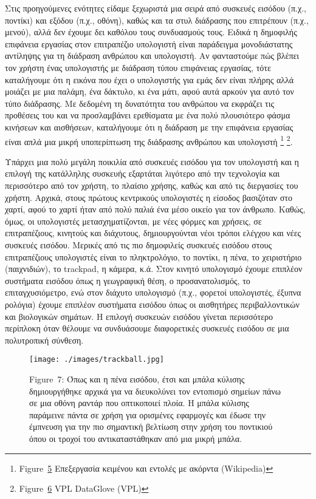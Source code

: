 \documentclass[
]{article}
\begin{document}
Στις προηγούμενες ενότητες είδαμε ξεχωριστά μια σειρά από συσκευές
εισόδου (π.χ., ποντίκι) και εξόδου (π.χ., οθόνη), καθώς και τα στυλ
διάδρασης που επιτρέπουν (π.χ., μενού), αλλά δεν έχουμε δει καθόλου τους
συνδυασμούς τους. Ειδικά η δημοφιλής επιφάνεια εργασίας στον επιτραπέζιο
υπολογιστή είναι παράδειγμα μονοδιάστατης αντίληψης για τη διάδραση
ανθρώπου και υπολογιστή. Αν φανταστούμε πώς βλέπει τον χρήστη ένας
υπολογιστής με διάδραση τύπου επιφάνειας εργασίας, τότε καταλήγουμε ότι
η εικόνα που έχει ο υπολογιστής για εμάς δεν είναι πλήρης αλλά μοιάζει
με μια παλάμη, ένα δάκτυλο, κι ένα μάτι, αφού αυτά αρκούν για αυτό τον
τύπο διάδρασης. Με δεδομένη τη δυνατότητα του ανθρώπου να εκφράζει τις
προθέσεις του και να προσλαμβάνει ερεθίσματα με ένα πολύ πλουσιότερο
φάσμα κινήσεων και αισθήσεων, καταλήγουμε ότι η διάδραση με την
επιφάνεια εργασίας είναι απλά μια μικρή υποπερίπτωση της διάδρασης
ανθρώπου και υπολογιστή \footnote{Figure~\protect\hyperlink{fig:chorded-input}{5}
  Επεξεργασία κειμένου και εντολές με ακόρντα (Wikipedia)} \footnote{Figure~\protect\hyperlink{fig:vpl-data-glove}{6}
  VPL DataGlove (VPL)}.

Υπάρχει μια πολύ μεγάλη ποικιλία από συσκευές εισόδου για τον υπολογιστή
και η επιλογή της κατάλληλης συσκευής εξαρτάται λιγότερο από την
τεχνολογία και περισσότερο από τον χρήστη, το πλαίσιο χρήσης, καθώς και
από τις διεργασίες του χρήστη. Αρχικά, στους πρώτους κεντρικούς
υπολογιστές η είσοδος βασιζόταν στο χαρτί, αφού το χαρτί ήταν από πολύ
παλιά ένα μέσο οικείο για τον άνθρωπο. Καθώς, όμως, οι υπολογιστές
μετασχηματίζονται, με νέες φόρμες και χρήσεις, σε επιτραπέζιους,
κινητούς και διάχυτους, δημιουργούνται νέοι τρόποι ελέγχου και νέες
συσκευές εισόδου. Μερικές από τις πιο δημοφιλείς συσκευές εισόδου στους
επιτραπέζιους υπολογιστές είναι το πληκτρολόγιο, το ποντίκι, η πένα, το
χειριστήριο (παιχνιδιών), το trackpad, η κάμερα, κ.ά. Στον κινητό
υπολογισμό έχουμε επιπλέον συστήματα εισόδου όπως η γεωγραφική θέση, ο
προσανατολισμός, το επιταγχυσιόμετρο, ενώ στον διάχυτο υπολογισμό (π.χ.,
φορετοί υπολογιστές, έξυπνα ρολόγια) έχουμε επιπλέον συστήματα εισόδου
όπως οι αισθητήρες περιβαλλοντικών και βιολογικών σημάτων. Η επιλογή
συσκευών εισόδου γίνεται περισσότερο περίπλοκη όταν θέλουμε να
συνδυάσουμε διαφορετικές συσκευές εισόδου σε μια πολυτροπική σύνθεση.

\leavevmode{}%
\begin{figure}
\hypertarget{fig:trackball}{%
\centering
\texttt{[image: ./images/trackball.jpg]}
\caption{Figure~7: Όπως και η πένα εισόδου, έτσι και μπάλα κύλισης
δημιουργήθηκε αρχικά για να διευκολύνει τον εντοπισμό σημείων πάνω σε
μια οθόνη ραντάρ που οπτικοποιεί πλοία. Η μπάλα κύλισης παράμεινε πάντα
σε χρήση για ορισμένες εφαρμογές και έδωσε την έμπνευση για την πιο
σημαντική βελτίωση στην χρήση του ποντικιού όπου οι τροχοί του
αντικαταστάθηκαν από μια μικρή μπάλα.}\label{fig:trackball}
}
\end{figure}
\end{document}
